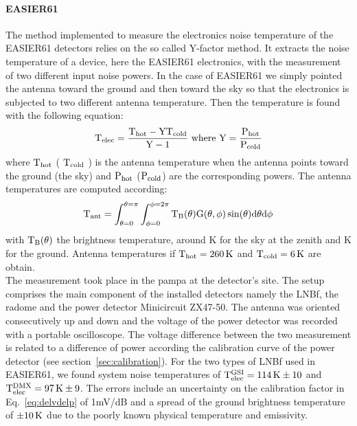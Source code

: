 \paragraph{EASIER61}
The method implemented to measure the electronics noise temperature of the EASIER61 detectors relies on the so called Y-factor method. It extracts the noise temperature of a device, here the EASIER61 electronics, with the measurement of two different input noise powers. In the case of EASIER61 we simply pointed the antenna toward the ground and then toward the sky so that the electronics is subjected to two different antenna temperature. Then the temperature is found with the following equation:
\begin{equation}
	\rm	T_{elec} = \frac{T_{hot} - YT_{cold}}{Y-1} \ where \ Y = \frac{P_{hot}}{P_{cold}}
\end{equation}
where $\rm T_{hot}$ ( $\rm T_{cold}$ ) is the antenna temperature when the antenna points toward the ground (the sky) and $\rm P_{hot}$ ($\rm P_{cold}$) are the corresponding powers. The antenna temperatures are computed according:
\begin{equation}
\rm  T_{ant} = \rm \int_{\theta =  0}^{\theta = \pi}\int_{\phi = 0}^{\phi =
    2\pi} T_{B}(\theta) G(\theta,\phi) \sin(\theta) d\theta d\phi
\label{eq:tant}
\end{equation}
with $\rm T_{B}(\theta)$ the brightness temperature, around \unit[4]{K} for the sky at the zenith and \unit[270]{K} for the ground. Antenna temperatures if  $\rm T_{hot} = \unit[260]{K}$ and $\rm T_{cold} = \unit[6]{K}$ are obtain. \\ The measurement took place in the pampa at the detector's site. The setup comprises the main component of the installed detectors namely the LNBf, the radome and the power detector Minicircuit ZX47-50. The antenna was oriented consecutively up and down and the voltage of the power detector was recorded with a portable oscilloscope. The voltage difference between the two measurement is related to a difference of power according the calibration curve  of the power detector (see section~\ref{sec:calibration}). For the two types of LNBf used in EASIER61, we found system noise temperatures of $\rm T^{GSI}_{elec} =  \unit[114]{K} \pm 10$ and $\rm  T^{DMX}_{elec}  =  \unit[97]{K}   \pm  9$. The errors include an uncertainty on the calibration factor in Eq.~\eqref{eq:delvdelp} of 1mV/dB and a spread of the ground brightness temperature of $\rm \pm \unit[10]{K}$ due to the poorly known physical temperature and emissivity.



